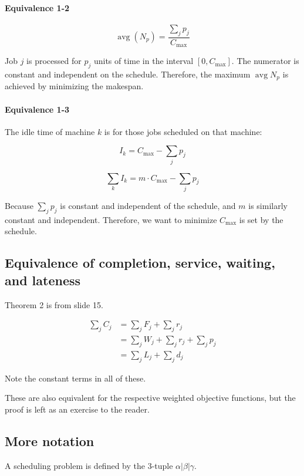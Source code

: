 \documentclass{idc_msc}
\DeclareMathOperator*{\avg}{avg}
\begin{document}
\paragraph{Equivalence 1-2}

\[\avg(N_p) = \frac{\sum_j p_j}{C_{\max}}\]

Job \(j\) is processed for \(p_j\) units of time in the interval \([0, C_{\max}]\).
The numerator is constant and independent on the schedule.
Therefore, the maximum \(\avg N_p\) is achieved by minimizing the makespan.

\paragraph{Equivalence 1-3}

The idle time of machine \(k\) is for those jobs scheduled on that machine:

\[I_k = C_{\max} - \sum_j p_j\]

\[\sum_k I_k = m \cdot C_{\max} - \sum_j p_j\]

Because \(\sum_j p_j\) is constant and independent of the schedule, and \(m\) is similarly constant and independent.
Therefore, we want to minimize \(C_{\max}\) is set by the schedule.


\subsection{Equivalence of completion, service, waiting, and lateness}

Theorem 2 is from slide 15.

\[
\begin{aligned}
\sum_j C_j &= \sum_j F_j + \sum_j r_j \\
&= \sum_j W_j + \sum_j r_j + \sum_j p_j \\
&= \sum_j L_j + \sum_j d_j
\end{aligned}
\]

Note the constant terms in all of these.

These are also equivalent for the respective weighted objective functions, but the proof is left as an exercise to the reader.

\subsection{More notation}

A scheduling problem is defined by the 3-tuple \(\alpha | \beta | \gamma\).
\end{document}
